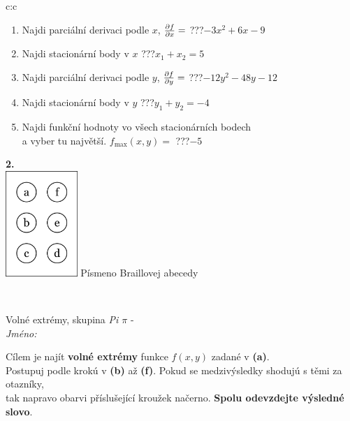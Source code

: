 \documentclass[10pt]{report}
\begin{document}
\begin{tabular}{c:c}
\begin{minipage}[c][104.5mm][t]{0.5\linewidth}
\begin{center}
\begin{minipage}{0.79\linewidth}
\begin{center}
\begin{varwidth}{\linewidth}
\begin{enumerate}
\item Najdi parciální derivaci podle $x$, $\pdv{f}{x}=$\quad \dotfill\; ???\;\dotfill \quad $-3x^2+6x-9$
\item Najdi stacionární body v $x$\quad \dotfill\; ???\;\dotfill \quad $x_1+x_2=5$
\item Najdi parciální derivaci podle $y$, $\pdv{f}{y}=$\quad \dotfill\; ???\;\dotfill \quad $-12y^2-48y-12$
\item Najdi stacionární body v $y$\quad \dotfill\; ???\;\dotfill \quad $y_1+y_2=-4$
\item Najdi funkční hodnoty vo všech stacionárních bodech \\ \phantom{xxxxxx} a vyber tu najvětší. $f_{\text{max}}(x,y)=$\quad \dotfill\; ???\;\dotfill \quad $-5$
\end{enumerate}
\end{varwidth}
\end{center}
\end{minipage}
\begin{minipage}{0.20\linewidth}
\begin{center}
{\Huge\bfseries 2.} \\[2mm]
\includegraphics[height=40mm]{../images/braille.png}
{\small Písmeno Braillovej abecedy}
\end{center}
\end{minipage}
\end{center}
\end{minipage}
\\ \hdashline
\begin{minipage}[c][104.5mm][t]{0.5\linewidth}
\begin{center}
\vspace{7mm}
{\huge Volné extrémy, skupina \textit{Pi $\pi$} -}\\[5mm]
\textit{Jméno:}\phantom{xxxxxxxxxxxxxxxxxxxxxxxxxxxxxxxxxxxxxxxxxxxxxxxxxxxxxxxxxxxxxxxxx}\\[5mm]
\begin{minipage}{0.95\linewidth}
\begin{center}
Cílem je najít \textbf{volné extrémy} funkce $f(x,y)$ zadané v \textbf{(a)}.\\Postupuj podle krokú v \textbf{(b)} až \textbf{(f)}. Pokud se medzivýsledky shodujú s těmi za otazníky,\\tak napravo obarvi příslušející kroužek načerno. \textbf{Spolu odevzdejte výsledné slovo}.

\end{center}
\end{minipage}
\end{center}
\end{minipage}
\end{tabular}
\end{document}

